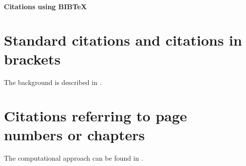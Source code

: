 \documentclass[11pt]{article}
\newcommand{\Bib}{B{\normalsize IB}\TeX}
\begin{document}
\textbf{\LARGE Citations using \Bib}

\vspace{4mm}
\section{Standard citations and citations in brackets}
The background is described in \cite{cramerleadbetter:1967}
\citep[for further details see][]{Baxrychwil:2005}.
\citep[for even further details see][]{newbook:2019}

\section{Citations referring to page numbers or chapters}
The computational approach can be found in \citet[p 54]{geweke1}
\citep[for implementation issues see][p 95]{Rlang:2005}.




\end{document}
